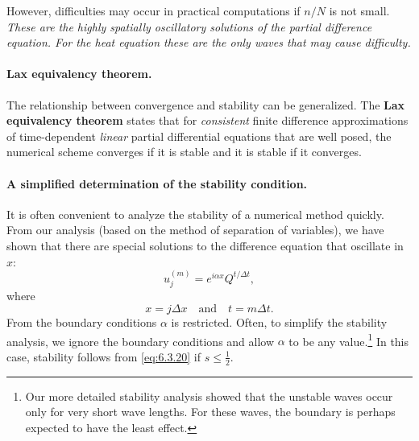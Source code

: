 However, difficulties may occur in practical computations if $n/N$ is not small.  \emph{These are the highly spatially oscillatory solutions of the partial difference equation.  For the heat equation these are the only waves that may cause difficulty.}

\paragraph{Lax equivalency theorem.}
The relationship between convergence and stability can be generalized.  The \textbf{Lax equivalency theorem} states that for \emph{consistent} finite difference approximations of time-dependent \emph{linear} partial differential equations that are well posed, the numerical scheme converges if it is stable and it is stable if it converges.

\paragraph{A simplified determination of the stability condition.}
It is often convenient to analyze the stability of a numerical method quickly.  From our analysis (based on the method of separation of variables), we have shown that there are special solutions to the difference equation that oscillate in $x$:
\begin{equation}
u_j^{(m)} = e^{i\alpha x}Q^{t/\Delta t},
\label{eq:6.3.30}
\end{equation}
where
\[
x = j\Delta x \quad\text{and}\quad t = m\Delta t.
\]
From the boundary conditions $\alpha$ is restricted.  Often, to simplify the stability analysis, we ignore the boundary conditions and allow $\alpha$ to be any value.\footnote{Our more detailed stability analysis showed that the unstable waves occur only for very short wave lengths.  For these waves, the boundary is perhaps expected to have the least effect.}  In this case, stability follows from \eqref{eq:6.3.20} if $s \le \frac{1}{2}$.

